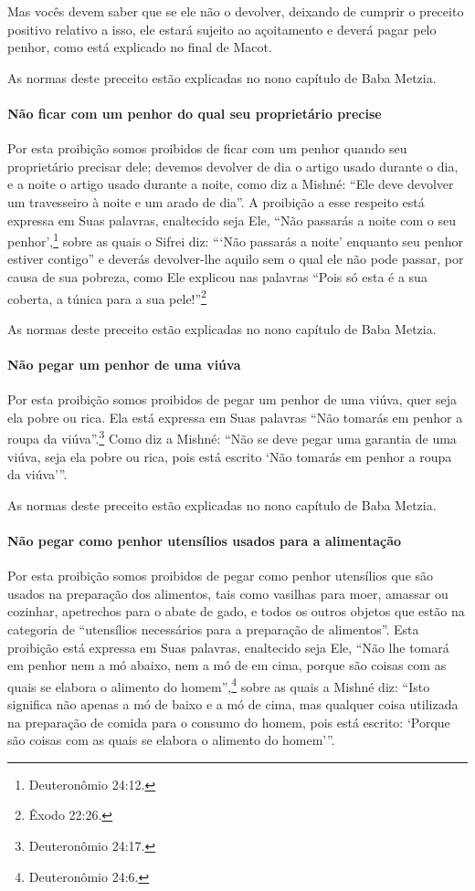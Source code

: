 Mas vocês devem saber que se ele não o devolver, deixando de cumprir o
preceito positivo relativo a isso, ele estará sujeito ao açoitamento e
deverá pagar pelo penhor, como está explicado no final de Macot.

As normas deste preceito estão explicadas no nono capítulo de Baba Metzia.

\paragraph{Não ficar com um penhor do qual seu proprietário precise}

Por esta proibição somos proibidos de ficar com um penhor quando seu
proprietário precisar dele; devemos devolver de dia o artigo usado
durante o dia, e a noite o artigo usado durante a noite, como diz a
Mishné: ``Ele deve devolver um travesseiro à noite e um arado de dia''.
A proibição a esse respeito está expressa em Suas palavras, enaltecido
seja Ele, ``Não passarás a noite com o seu penhor',\footnote{Deuteronômio
24:12.} sobre as quais o Sifrei diz: ```Não passarás a noite' enquanto
seu penhor estiver contigo'' e deverás devolver-lhe aquilo sem o qual
ele não pode passar, por causa de sua pobreza, como Ele explicou nas
palavras ``Pois só esta é a sua coberta, a túnica para a sua pele!''\footnote{Êxodo 22:26.}

As normas deste preceito estão explicadas no nono capítulo de Baba Metzia.

\paragraph{Não pegar um penhor de uma viúva}

Por esta proibição somos proibidos de pegar um penhor de uma viúva,
quer seja ela pobre ou rica. Ela está expressa em Suas palavras ``Não
tomarás em penhor a roupa da viúva''.\footnote{Deuteronômio 24:17.} Como diz a
Mishné: ``Não se deve pegar uma garantia de uma viúva, seja ela pobre ou
rica, pois está escrito `Não tomarás em penhor a roupa da viúva'''.

As normas deste preceito estão explicadas no nono capítulo de Baba Metzia.

\paragraph{Não pegar como penhor utensílios usados para a alimentação}

Por esta proibição somos proibidos de pegar como penhor utensílios que
são usados na preparação dos alimentos, tais como vasilhas para moer,
amassar ou cozinhar, apetrechos para o abate de gado, e todos os outros
objetos que estão na categoria de ``utensílios necessários para a
preparação de alimentos''. Esta proibição está expressa em Suas
palavras, enaltecido seja Ele, ``Não lhe tomará em penhor nem a mó
abaixo, nem a mó de em cima, porque são coisas com as quais se elabora o
alimento do homem'',\footnote{Deuteronômio 24:6.} sobre as quais a Mishné diz:
``Isto significa não apenas a mó de baixo e a mó de cima, mas qualquer
coisa utilizada na preparação de comida para o consumo do homem, pois
está escrito: `Porque são coisas com as quais se elabora o alimento do
homem'''.

